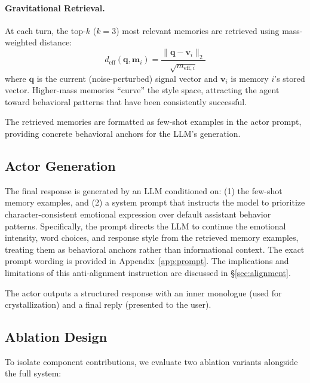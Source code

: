 \paragraph{Gravitational Retrieval.} At each turn, the top-$k$ ($k=3$) most relevant memories are retrieved using mass-weighted distance:
\begin{equation}
    d_\text{eff}(\mathbf{q}, \mathbf{m}_i) = \frac{\|\mathbf{q} - \mathbf{v}_i\|_2}{\sqrt{m_{\text{eff},i}}}
\end{equation}
where $\mathbf{q}$ is the current (noise-perturbed) signal vector and $\mathbf{v}_i$ is memory $i$'s stored vector. Higher-mass memories ``curve'' the style space, attracting the agent toward behavioral patterns that have been consistently successful.

The retrieved memories are formatted as few-shot examples in the actor prompt, providing concrete behavioral anchors for the LLM's generation.

\subsection{Actor Generation}

The final response is generated by an LLM conditioned on: (1) the few-shot memory examples, and (2) a system prompt that instructs the model to prioritize character-consistent emotional expression over default assistant behavior patterns. Specifically, the prompt directs the LLM to continue the emotional intensity, word choices, and response style from the retrieved memory examples, treating them as behavioral anchors rather than informational context. The exact prompt wording is provided in Appendix~\ref{app:prompt}. The implications and limitations of this anti-alignment instruction are discussed in \S\ref{sec:alignment}.

The actor outputs a structured response with an inner monologue (used for crystallization) and a final reply (presented to the user).

\subsection{Ablation Design}

To isolate component contributions, we evaluate two ablation variants alongside the full system:


